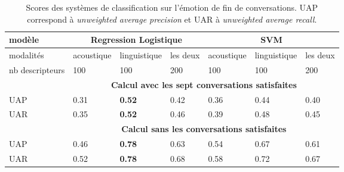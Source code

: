 \begin{table}[h]
  \centering
  \begin{tabular}{|l| l l l | l l l|}
    \hline
    modèle    &\multicolumn{3}{c|}{Regression Logistique} &\multicolumn{3}{c|}{SVM} \\
    \hline
    modalités    &acoustique  &linguistique  &les deux  &acoustique  &linguistique  &les deux\\
    nb descripteurs         & 100&100&200 & 100&100 &200\\
    \hline
    &\multicolumn{6}{c|}{\textbf{Calcul avec les sept conversations satisfaites}}\\
    \hline
    UAP           &0.31  &\textbf{0.52}  & 0.42 &0.36 &0.44  &0.40 \\
    UAR              &0.35  &\textbf{0.52}  &0.46 &0.39  &0.48  & 0.45\\
    \hline
    &\multicolumn{6}{c|}{\textbf{Calcul sans les conversations satisfaites}}\\
    \hline
    UAP           &0.46 &\textbf{0.78} &0.63 &0.54 &0.67 &0.61 \\
    UAR              &0.52 &\textbf{0.78} &0.68 &0.58 &0.72 &0.67 \\
    \hline
  \end{tabular}
\caption{Scores des systèmes de classification sur l'émotion de fin de conversations. UAP correspond à \textit{unweighted average precision} et UAR à \textit{unweighted average recall}.}
\label{tab:resultClassifDiscrete}
\end{table}
